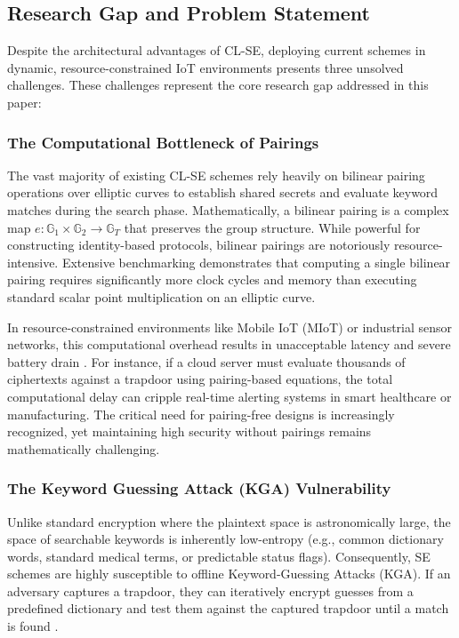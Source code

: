 \documentclass[10pt,journal,compsoc]{IEEEtran}
\begin{document}
\subsection{Research Gap and Problem Statement}
Despite the architectural advantages of CL-SE, deploying current schemes in dynamic, resource-constrained IoT environments presents three unsolved challenges. These challenges represent the core research gap addressed in this paper:

\subsubsection{The Computational Bottleneck of Pairings}
The vast majority of existing CL-SE schemes \cite{lu2023certificateless, elhabob2020efficient} rely heavily on bilinear pairing operations over elliptic curves to establish shared secrets and evaluate keyword matches during the search phase. Mathematically, a bilinear pairing is a complex map $e: \mathbb{G}_1 \times \mathbb{G}_2 \rightarrow \mathbb{G}_T$ that preserves the group structure. While powerful for constructing identity-based protocols, bilinear pairings are notoriously resource-intensive. Extensive benchmarking demonstrates that computing a single bilinear pairing requires significantly more clock cycles and memory than executing standard scalar point multiplication on an elliptic curve. 

In resource-constrained environments like Mobile IoT (MIoT) or industrial sensor networks, this computational overhead results in unacceptable latency and severe battery drain \cite{liu2023pairing}. For instance, if a cloud server must evaluate thousands of ciphertexts against a trapdoor using pairing-based equations, the total computational delay can cripple real-time alerting systems in smart healthcare or manufacturing. The critical need for pairing-free designs is increasingly recognized, yet maintaining high security without pairings remains mathematically challenging.

\subsubsection{The Keyword Guessing Attack (KGA) Vulnerability}
Unlike standard encryption where the plaintext space is astronomically large, the space of searchable keywords is inherently low-entropy (e.g., common dictionary words, standard medical terms, or predictable status flags). Consequently, SE schemes are highly susceptible to offline Keyword-Guessing Attacks (KGA). If an adversary captures a trapdoor, they can iteratively encrypt guesses from a predefined dictionary and test them against the captured trapdoor until a match is found \cite{lu2023certificateless}. 
\end{document}
